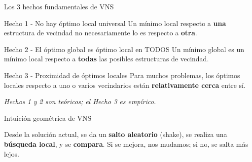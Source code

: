 \documentclass[aspectratio=169, 11pt, xcolor={dvipsnames,table}]{beamer}
\newcommand{\azul}[1]{\textcolor{UsachAzul}{#1}}
\begin{document}
\begin{frame}{Los 3 hechos fundamentales de VNS}
\begin{block}{Hecho 1 - No hay óptimo local universal}
Un mínimo local respecto a \textbf{una} estructura de vecindad
\azul{no necesariamente} lo es respecto a \textbf{otra}.
\end{block}

\begin{exampleblock}{Hecho 2 - El óptimo global es óptimo local en TODOS}
Un mínimo global es un mínimo local respecto a \textbf{todas} las posibles
estructuras de vecindad.
\end{exampleblock}

\begin{alertblock}{Hecho 3 - Proximidad de óptimos locales}
Para muchos problemas, los óptimos locales respecto a uno o varios vecindarios están
\textbf{relativamente cerca} entre sí.
\end{alertblock}

\begin{center}
\footnotesize\textit{Hechos 1 y 2 son teóricos; el Hecho 3 es empírico.}
\end{center}
\end{frame}




\begin{frame}{Intuición geométrica de VNS}
\begin{center}
\end{center}

\begin{ideaclave}
Desde la solución actual, se da un \textbf{salto aleatorio} (shake), se realiza una \textbf{búsqueda local}, y se \textbf{compara}. Si se mejora, nos mudamos; si no, se salta más lejos.
\end{ideaclave}
\end{frame}
\end{document}
